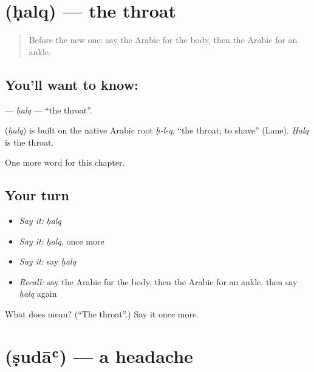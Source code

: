 \section[\texorpdfstring{\ar{حلق} (ḥalq)}{حلق (ḥalq)}]{ (ḥalq) — the throat}

\label{lesson:AR-C168-halq}



\begin{quote}
Before the new one: say the Arabic for the body, then the Arabic for an ankle.
\end{quote}

\subsection*{You'll want to know: }
\textbf{} — \emph{ḥalq} — \textquotedblleft{}the throat\textquotedblright{}.

\begin{cousinweb}
\textbf{} (\emph{ḥalq}) is built on the native Arabic root \emph{ḥ-l-q}, \textquotedblleft{}the throat; to shave\textquotedblright{} (Lane). \emph{Ḥalq} is the throat.
\end{cousinweb}

\begin{grammarlens}[title={What you've built}]
One more word for this chapter.
\end{grammarlens}

\subsection*{Your turn}
\begin{itemize}
\raggedright
  \item \emph{Say it:} \emph{ḥalq}
  \item \emph{Say it:} \emph{ḥalq}, once more
  \item \emph{Say it:} say \emph{ḥalq}
  \item \emph{Recall:} say the Arabic for the body, then the Arabic for an ankle, then say \emph{ḥalq} again
\end{itemize}

\begin{tcolorbox}[breakable,colback=teal!4,colframe=teal!35!black,title={Before you move on}]
What does  mean? (\textquotedblleft{}The throat\textquotedblright{}.) Say it once more.
\end{tcolorbox}
\section[\texorpdfstring{\ar{صداع} (ṣudāʿ)}{صداع (ṣudāʿ)}]{ (ṣudāʿ) — a headache}


